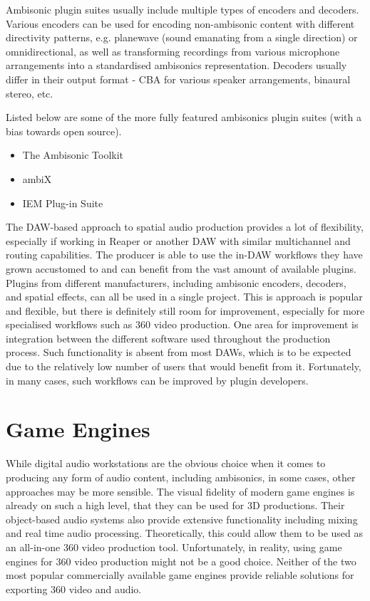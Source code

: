 Ambisonic plugin suites usually include multiple types of encoders and decoders. 
Various encoders can be used for encoding non-ambisonic content with different directivity patterns, 
e.g. planewave (sound emanating from a single direction) or omnidirectional,
as well as transforming recordings from various microphone arrangements into a standardised ambisonics representation.
Decoders usually differ in their output format - CBA for various speaker arrangements, binaural stereo, etc.

Listed below are some of the more fully featured ambisonics plugin suites (with a bias towards open source).
\begin{itemize}
    \item The Ambisonic Toolkit \cite{ambisonic_toolkit}
    \item ambiX \cite{ambiX}
    \item IEM Plug-in Suite \cite{iem_plugin_suite}
\end{itemize}

The DAW-based approach to spatial audio production provides a lot of flexibility,
especially if working in Reaper or another DAW with similar multichannel and routing capabilities.
The producer is able to use the in-DAW workflows they have grown accustomed to and can benefit
from the vast amount of available plugins. Plugins from different manufacturers, including ambisonic encoders, decoders, 
and spatial effects, can all be used in a single project.
This is approach is popular and flexible, but there is definitely still room for improvement, 
especially for more specialised workflows such as 360\degree{} video production.
One area for improvement is integration between the different software used throughout the production process.
Such functionality is absent from most DAWs, which is to be expected due to the relatively 
low number of users that would benefit from it.
Fortunately, in many cases, such workflows can be improved by plugin developers.

\section{Game Engines}

While digital audio workstations are the obvious choice when it comes to producing any form of audio content, 
including ambisonics, in some cases, other approaches may be more sensible. 
The visual fidelity of modern game engines is already on such a high level, that they can be used for
3D productions. Their object-based audio systems also provide extensive 
functionality including mixing and real time audio processing. \cite{unreal_doc_audio}\cite{unity_manual_audio}
Theoretically, this could allow them to be used as an all-in-one 360\degree{} video production tool.
Unfortunately, in reality, using game engines for 360\degree{} video production might not be a good choice.
Neither of the two most popular commercially available 
game engines provide reliable solutions for exporting 360\degree{} video and audio.

